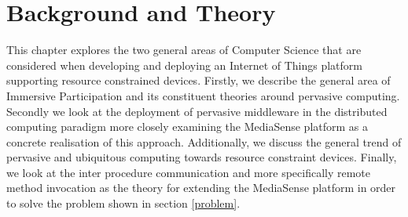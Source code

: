 \chapter{Background and Theory}
This chapter explores the two general areas of Computer Science that are considered when developing and deploying an Internet of Things platform supporting resource constrained devices. Firstly, we describe the general area of Immersive Participation and its constituent theories around pervasive computing. Secondly we look at the deployment of pervasive middleware in the distributed computing paradigm more closely examining the MediaSense platform as a concrete realisation of this approach. Additionally, we discuss the general trend of pervasive and ubiquitous computing towards resource constraint devices. Finally, we look at the inter procedure communication and more specifically remote method invocation as the theory for extending the MediaSense platform in order to solve the problem shown in section \ref{problem}. 










